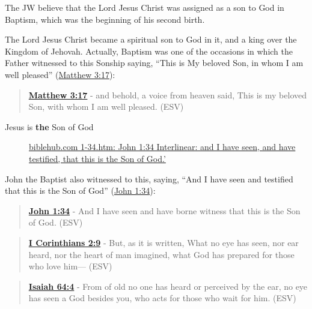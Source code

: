 \documentclass[11pt]{article}
\begin{document}
The JW believe that the Lord Jesus Christ was assigned as a son
to God in Baptism, which was the beginning of his second birth.

The Lord Jesus Christ became a spiritual son to God in it, and a
king over the Kingdom of Jehovah. Actually, Baptism was one
of the occasions in which the Father witnessed to this Sonship
saying, “This is My beloved Son, in whom I am well pleased”
(\href{https://www.biblegateway.com/passage/?search=Matthew\%203\%3A17\&version=ESV}{Matthew 3:17}):

\begin{quote}
\textbf{\href{https://www.biblegateway.com/passage/?search=Matthew\%203\%3A17\&version=ESV}{Matthew 3:17}} - and behold, a voice from heaven said, This is my beloved Son, with whom I am well pleased. (ESV)
\end{quote}

\begin{description}
\item[{Jesus is \textbf{the} Son of God}] \href{https://biblehub.com/interlinear/john/1-34.htm}{biblehub.com 1-34.htm: John 1:34 Interlinear: and I have seen, and have testified, that this is the Son of God.'}
\end{description}

John the Baptist also witnessed to this, saying,
“And I have seen and testified that this is the Son of God”
(\href{https://www.biblegateway.com/passage/?search=John\%201\%3A34\&version=ESV}{John 1:34}):

\begin{quote}
\textbf{\href{https://www.biblegateway.com/passage/?search=John\%201\%3A34\&version=ESV}{John 1:34}} - And I have seen and have borne witness that this is the Son of God. (ESV)
\end{quote}

\begin{quote}
\textbf{\href{https://www.biblegateway.com/passage/?search=1\%20Corinthians\%202\%3A9\&version=ESV}{I Corinthians 2:9}} - But, as it is written, What no eye has seen, nor ear heard, nor the heart of man imagined, what God has prepared for those who love him— (ESV)
\end{quote}

\begin{quote}
\textbf{\href{https://www.biblegateway.com/passage/?search=Isaiah\%2064\%3A4\&version=ESV}{Isaiah 64:4}} - From of old no one has heard or perceived by the ear, no eye has seen a God besides you, who acts for those who wait for him. (ESV)
\end{quote}
\end{document}
